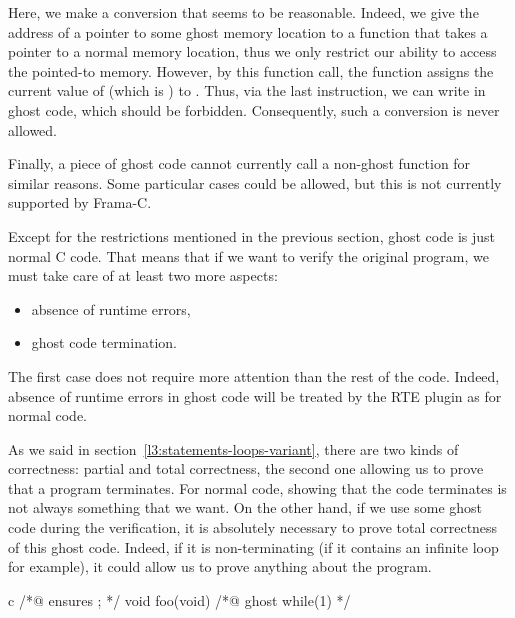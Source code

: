

Here, we make a conversion that seems to be reasonable. Indeed, we give
the address of a pointer to some ghost memory location to a function
that takes a pointer to a normal memory location, thus we only restrict our ability
to access the pointed-to memory. However, by this function call, the function
 assigns the current value of  (which is
) to . Thus, via the last instruction, we
can write  in ghost code, which should be forbidden.
Consequently, such a conversion is never allowed.


Finally, a piece of ghost code cannot currently call a non-ghost function for
similar reasons. Some particular cases could be allowed, but this is
not currently supported by Frama-C.


\label{l3:acsl-logic-definitions-what-remains}


Except for the restrictions mentioned in the previous section,
ghost code is just normal C code. That means that if we want to
verify the original program, we must take care of at least two more
aspects:
\begin{itemize}
\item absence of runtime errors,
\item ghost code termination.
\end{itemize}


The first case does not require more attention than the rest of the
code. Indeed, absence of runtime errors in ghost code will be treated
by the RTE plugin as for normal code.


As we said in section~\ref{l3:statements-loops-variant}, there are two
kinds of correctness: partial and total correctness, the second one allowing
us to prove that a program terminates. For normal code, showing that the code
terminates is not always something that we want. On the other hand, if we
use some ghost code during the verification, it is absolutely necessary to
prove total correctness of this ghost code. Indeed, if it is non-terminating
(if it contains an infinite loop for example), it could allow us to prove
anything about the program.


\begin{CodeBlock}{c}
/*@ ensures \false ; */
void foo(void){
  /*@ ghost
    while(1){}
  */
}
\end{CodeBlock}



